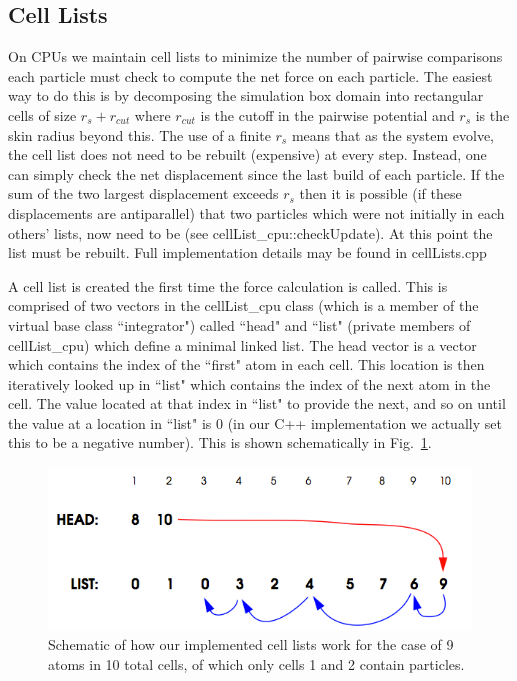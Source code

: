 \documentclass[12pt]{article}
\begin{document}
\subsection{Cell Lists}
On CPUs we maintain cell lists to minimize the number of pairwise comparisons each particle must check to compute the net force on each particle.  The easiest way to do this is by decomposing the simulation box domain into rectangular cells of size $r_s + r_{cut}$ where $r_{cut}$ is the cutoff in the pairwise potential and $r_s$ is the skin radius beyond this.  The use of a finite $r_s$ means that as the system evolve, the cell list does not need to be rebuilt (expensive) at every step.  Instead, one can simply check the net displacement since the last build of each particle.  If the sum of the two largest displacement exceeds $r_s$ then it is possible (if these displacements are antiparallel) that two particles which were not initially in each others' lists, now need to be (see cellList\_cpu::checkUpdate).  At this point the list must be rebuilt.  Full implementation details may be found in cellLists.cpp

A cell list is created the first time the force calculation is called.  This is comprised of two vectors in the cellList\_cpu class (which is a member of the virtual base class ``integrator") called ``head" and ``list" (private members of cellList\_cpu) which define a minimal linked list.
The head vector is a vector which contains the index of the ``first" atom in each cell.  This location is then iteratively looked up in ``list" which contains the index of the next atom in the cell.  The value located at that index in ``list" to provide the next, and so on until the value at a location in ``list" is 0 (in our C++ implementation we actually set this to be a negative number).  This is shown schematically in Fig.~\ref{fig:cell}.

\begin{figure}[H]
   	\includegraphics[width=\textwidth]{cell_list.png}
	\caption{Schematic of how our implemented cell lists work for the case of 9 atoms in 10 total cells, of which only cells 1 and 2 contain particles.}
	\label{fig:cell}
\end{figure}
\end{document}
